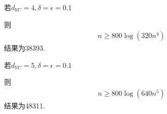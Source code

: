 \documentclass[12pt, a4paper]{article}
\begin{document}
若$d_{VC}=4, \delta=\epsilon=0.1$

则
\begin{align*}
    n \geq 800 \log(320n^4)
\end{align*}
结果为38393.

若$d_{VC}=5, \delta=\epsilon=0.1$

则
\begin{align*}
    n \geq 800 \log(640n^5)
\end{align*}
结果为48311.
\end{document}
